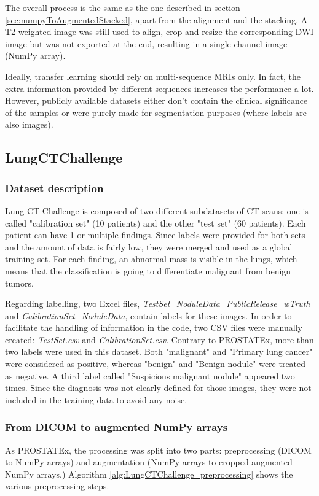 The overall process is the same as the one described in section \ref{sec:numpyToAugmentedStacked}, apart from the alignment and the stacking. A T2-weighted image was still used to align, crop and resize the corresponding DWI image but was not exported at the end, resulting in a single channel image (NumPy array).

Ideally, transfer learning should rely on multi-sequence MRIs only. In fact, the extra information provided by different sequences increases the performance a lot. However, publicly available datasets either don't contain the clinical significance of the samples or were purely made for segmentation purposes (where labels are also images). 


\subsection{LungCTChallenge}
\label{sec:lungCTChallenge}
\subsubsection{Dataset description}
Lung CT Challenge is composed of two different subdatasets of CT scans: one is called "calibration set" (10 patients) and the other "test set" (60 patients). Each patient can have 1 or multiple findings. Since labels were provided for both sets and the amount of data is fairly low, they were merged and used as a global training set. For each finding, an abnormal mass is visible in the lungs, which means that the classification is going to differentiate malignant from benign tumors. 

Regarding labelling, two Excel files, \textit{TestSet\_NoduleData\_PublicRelease\_wTruth} and \textit{CalibrationSet\_NoduleData}, contain labels for these images. In order to facilitate the handling of information in the code, two CSV files were manually created: \mbox{\textit{TestSet.csv}} and \textit{CalibrationSet.csv}.
Contrary to PROSTATEx, more than two labels were used in this dataset. Both "malignant" and "Primary lung cancer" were considered as positive, whereas "benign" and "Benign nodule" were treated as negative. A third label called "Suspicious malignant nodule" appeared two times. Since the diagnosis was not clearly defined for those images, they were not included in the training data to avoid any noise. 


\subsubsection{From DICOM to augmented NumPy arrays}
As PROSTATEx, the processing was split into two parts: preprocessing (DICOM to NumPy arrays) and augmentation (NumPy arrays to cropped augmented NumPy arrays.) Algorithm \ref{alg:LungCTChallenge_preprocessing} shows the various preprocessing steps. 

